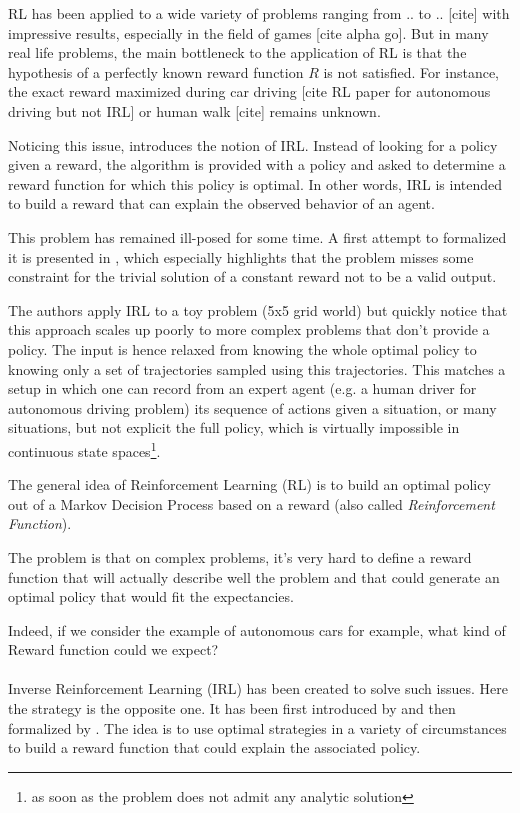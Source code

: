 \documentclass{article}
\begin{document}
RL has been applied to a wide variety of problems ranging from .. to .. [cite] with impressive results, especially in the field of games [cite alpha go]. But in many real life problems, the main bottleneck to the application of RL is that the hypothesis of a perfectly known reward function $R$ is not satisfied. For instance, the exact reward maximized during car driving [cite RL paper for autonomous driving but not IRL] or human walk [cite] remains unknown.

Noticing this issue, \cite{Russell98} introduces the notion of IRL. Instead of looking for a policy given a reward, the algorithm is provided with a policy and asked to determine a reward function for which this policy is optimal. In other words, IRL is intended to build a reward that can explain the observed behavior of an agent.

This problem has remained ill-posed for some time. A first attempt to formalized it is presented in \cite{Ng00}, which especially highlights that the problem misses some constraint for the trivial solution of a constant reward not to be a valid output.

The authors apply IRL to a toy problem (5x5 grid world) but quickly notice that this approach scales up poorly to more complex problems that don't provide a policy. The input is hence relaxed from knowing the whole optimal policy to knowing only a set of trajectories sampled using this trajectories. This matches a setup in which one can record from an expert agent (e.g. a human driver for autonomous driving problem) its sequence of actions given a situation, or many situations, but not explicit the full policy, which is virtually impossible in continuous state spaces\footnote{as soon as the problem does not admit any analytic solution}.


The general idea of Reinforcement Learning (RL) \cite{Sutton98} is to build an optimal policy out of a Markov Decision Process based on a reward (also called \emph{Reinforcement Function}).

The problem is that on complex problems, it's very hard to define a reward function that will actually describe well the problem and that could generate an optimal policy that would fit the expectancies.

Indeed, if we consider the example of autonomous cars \cite{Vasquez14} for example, what kind of Reward function could we expect?

\paragraph{}
Inverse Reinforcement Learning (IRL) has been created to solve such issues. Here the strategy is the opposite one. It has been first introduced by \cite{Russell98} and then formalized by \cite{Ng00}. The idea is to use optimal strategies in a variety of circumstances to build a reward function that could explain the associated policy.
\end{document}
